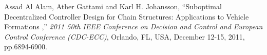 \documentclass[10pt]{beamer}
\begin{document}
\begin{frame}[allowframebreaks]
\begin{thebibliography}{00}
Assad Al Alam, Ather Gattami and Karl H. Johansson,
``Suboptimal Decentralized Controller Design for Chain Structures: Applications to Vehicle Formations ,''
\emph{2011 50th IEEE Conference on Decision and Control and European Control Conference (CDC-ECC)},
Orlando, FL, USA, December 12-15, 2011, pp.6894-6900.

\end{thebibliography}

     \addtocounter{framenumber}{-1}
\end{frame}


\end{document}
